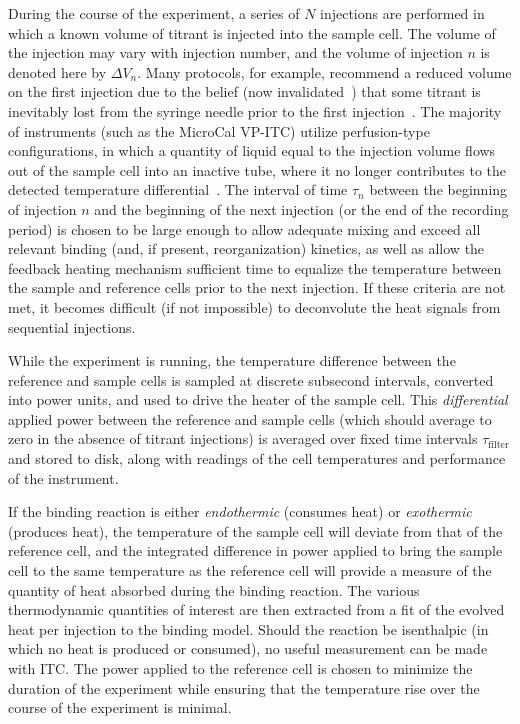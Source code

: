 \documentclass[aps,pre,twocolumn,nofootinbib,superscriptaddress,linenumbers]{revtex4-1}
\begin{document}
During the course of the experiment, a series of $N$ injections are performed in which a known volume of titrant is injected into the sample cell.
The volume of the injection may vary with injection number, and the volume of injection $n$ is denoted here by $\Delta V_n$.
Many protocols, for example, recommend a reduced volume on the first injection due to the belief (now invalidated~\cite{tellinghuisen:anal-biochem:2004:first-injection-anomaly}) that some titrant is inevitably lost from the syringe needle prior to the first injection~\cite{vp-itc-manual}.
The majority of instruments (such as the MicroCal VP-ITC) utilize perfusion-type configurations, in which a quantity of liquid equal to the injection volume flows out of the sample cell into an inactive tube, where it no longer contributes to the detected temperature differential~\cite{vp-itc-manual,tellinghuisen:anal-biochem:2004:volume-errors-in-itc}.
The interval of time $\tau_n$ between the beginning of injection $n$ and the beginning of the next injection (or the end of the recording period) is chosen to be large enough to allow adequate mixing and exceed all relevant binding (and, if present, reorganization) kinetics, as well as allow the feedback heating mechanism sufficient time to equalize the temperature between the sample and reference cells prior to the next injection.
If these criteria are not met, it becomes difficult (if not impossible) to deconvolute the heat signals from sequential injections.

While the experiment is running, the temperature difference between the reference and sample cells is sampled at discrete subsecond intervals, converted into power units, and used to drive the heater of the sample cell.
This \emph{differential} applied power between the reference and sample cells (which should average to zero in the absence of titrant injections) is averaged over fixed time intervals $\tau_\mathrm{filter}$ and stored to disk, along with readings of the cell temperatures and performance of the instrument.

If the binding reaction is either \emph{endothermic} (consumes heat) or \emph{exothermic} (produces heat), the temperature of the sample cell will deviate from that of the reference cell, and the integrated difference in power applied to bring the sample cell to the same temperature as the reference cell will provide a measure of the quantity of heat absorbed during the binding reaction.
The various thermodynamic quantities of interest are then extracted from a fit of the evolved heat per injection to the binding model.
Should the reaction be isenthalpic (in which no heat is produced or consumed), no useful measurement can be made with ITC.
The power applied to the reference cell is chosen to minimize the duration of the experiment while ensuring that the temperature rise over the course of the experiment is minimal.
\end{document}
